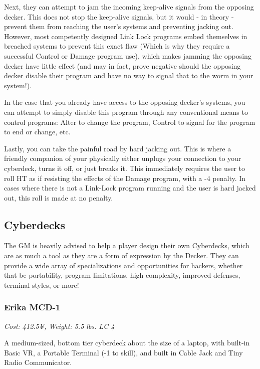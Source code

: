 \begin{multicols}{3}
	Next, they can attempt to jam the incoming keep-alive signals from the opposing decker. This does not stop the keep-alive signals, but it would - in theory - prevent them from reaching the user's systems and preventing jacking out. However, most competently designed Link Lock programs embed themselves in breached systems to prevent this exact flaw (Which is why they require a successful Control or Damage program use), which makes jamming the opposing decker have little effect (and may in fact, prove negative should the opposing decker disable their program and have no way to signal that to the worm in your system!).
	
	In the case that you already have access to the opposing decker's systems, you can attempt to simply disable this program through any conventional means to control programs: Alter to change the program, Control to signal for the program to end or change, etc.
	
	Lastly, you can take the painful road by hard jacking out. This is where a friendly companion of your physically either unplugs your connection to your cyberdeck, turns it off, or just breaks it. This immediately requires the user to roll HT as if resisting the effects of the Damage program, with a -4 penalty. In cases where there is not a Link-Lock program running and the user is hard jacked out, this roll is made at no penalty.
	
	\subsection{Cyberdecks}
	
	The GM is heavily advised to help a player design their own Cyberdecks, which are as much a tool as they are a form of expression by the Decker. They can provide a wide array of specializations and opportunities for hackers, whether that be portability, program limitations, high complexity, improved defenses, terminal styles, or more!
	
	\subsubsection*{Erika MCD-1}
	
	\textit{\textcolor{NavyBlue}{Cost: 412.5¥, Weight: 5.5 lbs. LC 4}}
	
	A medium-sized, bottom tier cyberdeck about the size of a laptop, with built-in Basic VR, a Portable Terminal (-1 to skill), and built in Cable Jack and Tiny Radio Communicator.
	

\end{multicols}
